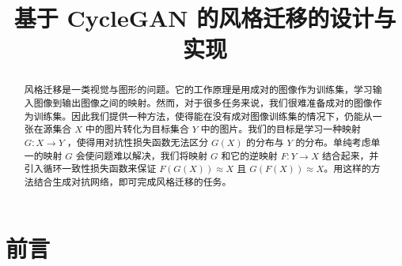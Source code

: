 \documentclass[conference]{IEEEtran}
\begin{document}
\title{
	基于 CycleGAN 的风格迁移的设计与实现
}

\author{
\and
{}
\and
{}
}


\maketitle

\begin{abstract}
风格迁移是一类视觉与图形的问题。它的工作原理是用成对的图像作为训练集，学习输入图像到输出图像之间的映射。然而，对于很多任务来说，我们很难准备成对的图像作为训练集。因此我们提供一种方法，使得能在没有成对图像训练集的情况下，仍能从一张在源集合 $X$ 中的图片转化为目标集合 $Y$ 中的图片。我们的目标是学习一种映射 $G: X \rightarrow Y$ ，使得用对抗性损失函数无法区分 $G(X)$ 的分布与 $Y$ 的分布。单纯考虑单一的映射 $G$ 会使问题难以解决，我们将映射 $G$ 和它的逆映射 $F: Y \rightarrow X$ 结合起来，并引入循环一致性损失函数来保证 $F(G(X)) \approx X$ 且 $G(F(X)) \approx X$。用这样的方法结合生成对抗网络，即可完成风格迁移的任务。
\end{abstract}


\section{前言}
\end{document}
